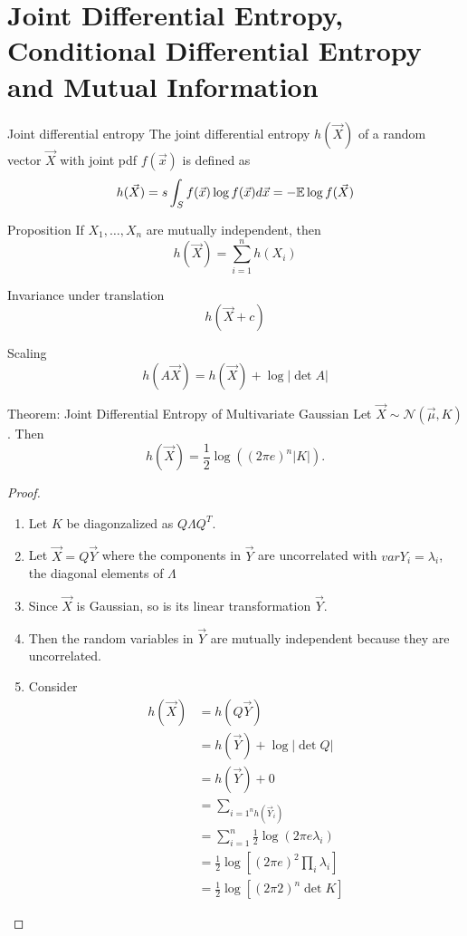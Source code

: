 \documentclass[../main.tex]{subfiles}
\begin{document}
\section{Joint Differential Entropy, Conditional Differential Entropy and Mutual Information}
\begin{gbox}{Joint differential entropy}
    The joint differential entropy $h(\vec X)$ of a random vector $\vec X$ with joint pdf $f(\vec x)$ is defined as \[
    h(\vec X) = s\int_S f(\vec x)\log f(\vec x)d\vec x =-\mathbb{E} \log f(\vec X)
    \]
\end{gbox}
\begin{bbox}{Proposition}
    If $X_1,\dots, X_n$ are mutually independent, then \[
    h(\vec X)=\sum_{i=1}^n h(X_i)
    \]
\end{bbox}
\begin{bbox}{Invariance under translation}\[
    h(\vec X+c)
    \]
\end{bbox}
\begin{bbox}{Scaling}
\[
    h(A\vec X) = h(\vec X) + \log |\det A|
    \]
\end{bbox}

\begin{bbox}{Theorem: Joint Differential Entropy of Multivariate Gaussian}
   Let \( \vec{X} \sim \mathcal{N}(\vec{\mu}, K) \). Then
    \[
        h(\vec{X}) = \frac{1}{2} \log \left( (2 \pi e)^n \lvert K \rvert \right).
    \]
    \begin{proof}
    \begin{enumerate}
        \item Let $K$ be diagonzalized as $Q\Lambda Q^T$.
        \item Let $\vec X = Q\vec Y$ where the components in $\vec Y$ are uncorrelated with $var Y_i=\lambda_i$, the diagonal elements of $\Lambda$
        \item Since $\vec X$ is Gaussian, so is its linear transformation $\vec Y$.
        \item Then the random variables in $\vec Y$ are mutually independent because they are uncorrelated.
        \item Consider \begin{align*}
            h(\vec X) &= h(Q\vec Y)\\
            &= h(\vec Y) + \log|\det Q|\\
            &= h(\vec Y) + 0\\
            &= \sum_{i=1^n h(\vec Y_i)}\\
            &= \sum_{i=1}^n\frac{1}{2}\log(2\pi e\lambda_i)\\
            &=\frac{1}{2}\log\left[(2\pi e)^2\prod_i\lambda_i\right]\\
            &= \frac{1}{2}\log\left[(2\pi 2)^n\det K\right]
        \end{align*}
    \end{enumerate}
    \end{proof}
\end{bbox}
\end{document}
